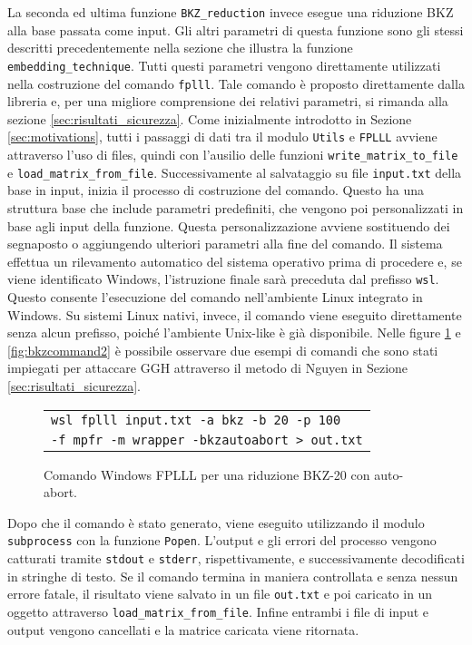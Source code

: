 La seconda ed ultima funzione \texttt{BKZ\_reduction} invece esegue una riduzione BKZ alla 
base passata come input. Gli altri parametri di questa funzione sono gli stessi 
descritti precedentemente nella sezione che illustra la funzione \texttt{embedding\_technique}. 
Tutti questi parametri vengono direttamente utilizzati nella costruzione del comando 
\texttt{fplll}. Tale comando è proposto direttamente dalla libreria e, per una migliore 
comprensione dei relativi parametri, si rimanda alla sezione \ref{sec:risultati_sicurezza}.
Come inizialmente introdotto in Sezione \ref{sec:motivations}, tutti i passaggi di dati 
tra il modulo \texttt{Utils} e \texttt{FPLLL} avviene attraverso l'uso di files, quindi 
con l'ausilio delle funzioni \texttt{write\_matrix\_to\_file} e \texttt{load\_matrix\_from\_file}.
Successivamente al salvataggio su file \texttt{input.txt} della base in input, inizia
il processo di costruzione del comando. 
Questo ha una struttura base che include parametri predefiniti, che vengono poi personalizzati 
in base agli input della funzione. Questa personalizzazione avviene sostituendo dei 
segnaposto o aggiungendo ulteriori parametri alla fine del comando. 
Il sistema effettua un rilevamento automatico del sistema operativo prima di procedere e,  
se viene identificato Windows, l'istruzione finale sarà preceduta dal prefisso \texttt{wsl}. 
Questo consente l'esecuzione del comando nell'ambiente Linux integrato in Windows. 
Su sistemi Linux nativi, invece, il comando viene eseguito 
direttamente senza alcun prefisso, poiché l'ambiente Unix-like è già disponibile.
Nelle figure 
\ref{fig:bkzcommand1} e \ref{fig:bkzcommand2} è possibile osservare due esempi di comandi
che sono stati impiegati per attaccare GGH attraverso il metodo di Nguyen in Sezione 
\ref{sec:risultati_sicurezza}.  


\begin{figure}[h]
    \centering
    \begin{tabular}{l}
        \texttt{wsl fplll input.txt -a bkz -b 20 -p 100} \\
        \texttt{-f mpfr -m wrapper -bkzautoabort > out.txt}
    \end{tabular}
    \caption[Comando Linux FPLLL per BKZ-20.]
    {Comando Windows FPLLL per una riduzione BKZ-20 con auto-abort.}
    \label{fig:bkzcommand1}
\end{figure}

Dopo che il comando è stato generato, viene eseguito utilizzando il modulo \texttt{subprocess}
con la funzione \texttt{Popen}. 
L'output e gli errori del processo vengono catturati tramite \texttt{stdout} e \texttt{stderr}, 
rispettivamente, e successivamente decodificati in stringhe di testo.
Se il comando termina in maniera controllata e senza nessun errore fatale, il risultato
viene salvato in un file \texttt{out.txt} e poi caricato in un oggetto attraverso
\texttt{load\_matrix\_from\_file}. 
Infine entrambi i file di input e output vengono cancellati e la matrice caricata viene
ritornata. 


